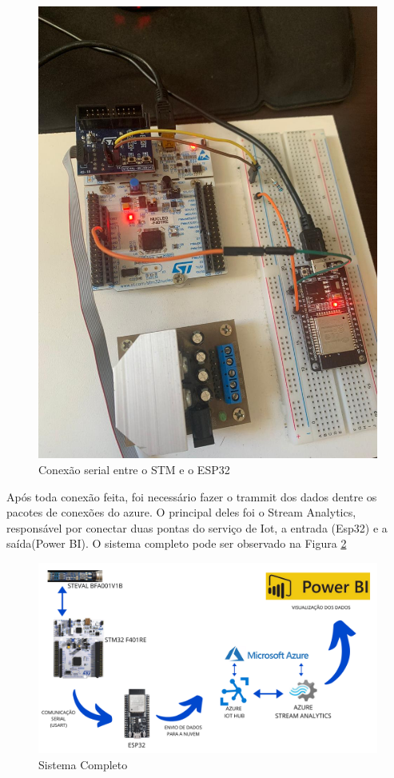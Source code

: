 \documentclass[
	article,			%
	12pt,				%
	oneside,			%
	a4paper,			%
	section=TITLE,		%
	subsection=TITLE,	%
	english,			%
	brazil,				%
	sumario=tradicional
	]{abntex2}
\begin{document}
\begin{figure}[H]
    \centering
    \includegraphics[scale=0.15]{conexao.png}
    \caption{Conexão serial entre o STM e o ESP32}
    \label{fig:conexao}
\end{figure}

Após toda conexão feita, foi necessário fazer o trammit dos dados dentre os pacotes de conexões do azure. O principal deles foi o Stream Analytics, responsável por conectar duas pontas do serviço de Iot, a entrada (Esp32) e a saída(Power BI). O sistema completo pode ser observado na Figura \ref{fig:sistema}

\begin{figure}[H]
    \centering
    \includegraphics[scale=0.3]{sistema_completo.png}
    \caption{Sistema Completo}
    \label{fig:sistema}
\end{figure}
\end{document}
